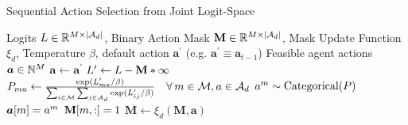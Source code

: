 \begin{algorithm}[t]
\caption{Sequential Action Selection from Joint Logit-Space}
\label{alg:seq-action-selection}
\begin{spacing}{1.0}  %
\begin{algorithmic}[1]
\REQUIRE Logits $L \in \mathbb{R}^{{M} \times |\mathcal{A}_d|}$, Binary Action Mask $\mathbf{M} \in \mathbb{R}^{{M} \times |\mathcal{A}_d|}$, Mask Update Function $\xi_d$, Temperature $\beta$, default action $\bm{a}^\prime$ (e.g. $\bm{a}^\prime \equiv \bm{a}_{t-1}$)
\ENSURE Feasible agent actions $\bm{a} \in \mathbb{N}^{M}$
\STATE $\bm{a} \gets \bm{a}^\prime$ \hfill \textcolor{lightgray}{}
    \STATE $L^\prime \gets L -  \textbf{M} * \infty$ \hfill \textcolor{lightgray}{}
    \vspace{1mm}
    \STATE $P_{{m} a} \gets \frac{\text{exp}(L^\prime_{ma} / \beta)}{\sum_{i\in \mathcal{M}} \sum_{j\in \mathcal{A}_d} \exp(L^\prime_{ij} / \beta)} \quad \forall \, {m} \in \mathcal{M}, a \in \mathcal{A}_d$ \hfill \textcolor{lightgray}{} \vspace{1mm}
    \STATE $a^{m} \sim \text{Categorical}(P)$ \hfill \textcolor{lightgray}{}
    \STATE $\bm{a}[{m}] = a^{m}$ \hfill \textcolor{lightgray}{}
    \STATE \( \textbf{M}[{m}, :] = 1 \) \hfill  \textcolor{lightgray}{}
    \STATE $\textbf{M} \gets \xi_d(\textbf{M}, \bm{a})$ \hfill \textcolor{lightgray}{}
\ENDWHILE
\end{algorithmic}
\end{spacing}
\end{algorithm}